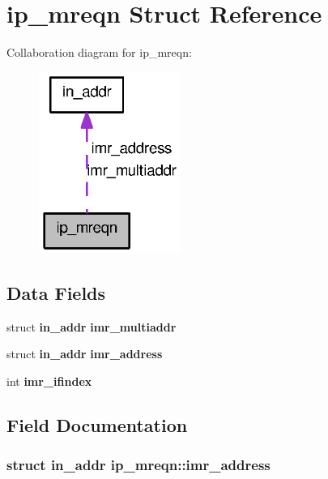 \section{ip\_\-mreqn Struct Reference}
\label{structip__mreqn}


Collaboration diagram for ip\_\-mreqn:
\nopagebreak
\begin{figure}[H]
\begin{center}
\leavevmode
\includegraphics[width=131pt]{structip__mreqn__coll__graph}
\end{center}
\end{figure}
\subsection*{Data Fields}
\begin{DoxyCompactItemize}
\item 
struct {\bf in\_\-addr} {\bf imr\_\-multiaddr}
\item 
struct {\bf in\_\-addr} {\bf imr\_\-address}
\item 
int {\bf imr\_\-ifindex}
\end{DoxyCompactItemize}


\subsection{Field Documentation}
\subsubsection[{imr\_\-address}]{\setlength{\rightskip}{0pt plus 5cm}struct {\bf in\_\-addr} {\bf ip\_\-mreqn::imr\_\-address}}\label{structip__mreqn_aee21b302d5440d290318480657c0956c}
